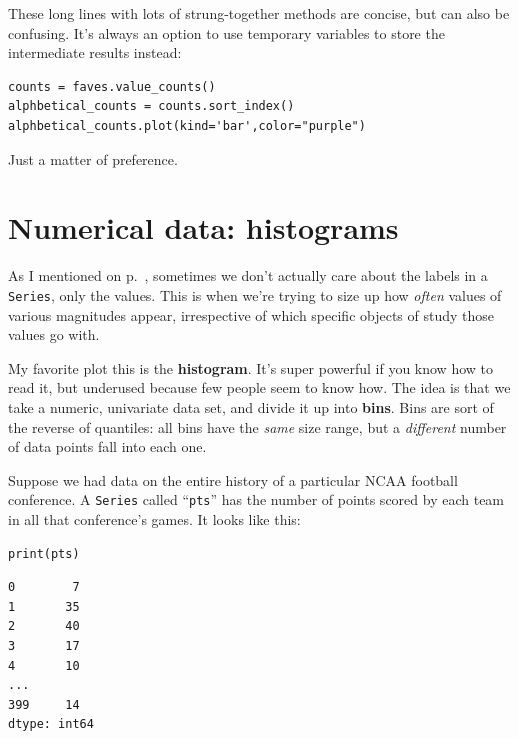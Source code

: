 These long lines with lots of strung-together methods are concise, but can also
be confusing. It's always an option to use temporary variables to store the
intermediate results instead:

\begin{Verbatim}[fontsize=\small,samepage=true,frame=single,framesep=3mm]
counts = faves.value_counts()
alphbetical_counts = counts.sort_index()
alphbetical_counts.plot(kind='bar',color="purple")
\end{Verbatim}

Just a matter of preference.

\section{Numerical data: histograms}


As I mentioned on p.~\pageref{twoWaysToPlotUnivariateData}, sometimes we don't
actually care about the labels in a \texttt{Series}, only the values. This is
when we're trying to size up how \textit{often} values of various magnitudes
appear, irrespective of which specific objects of study those values go with.


My favorite plot this is the \textbf{histogram}. It's super powerful if you
know how to read it, but underused because few people seem to know how. The
idea is that we take a numeric, univariate data set, and divide it up into
\textbf{bins}. Bins are sort of the reverse of quantiles: all bins have the
\textit{same} size range, but a \textit{different} number of data points fall
into each one.

\label{NCAAData}

Suppose we had data on the entire history of a particular NCAA football
conference. A \texttt{Series} called ``\texttt{pts}'' has the number of points
scored by each team in all that conference's games. It looks like this:

\begin{Verbatim}[fontsize=\small,samepage=true,frame=single,framesep=3mm]
print(pts)
\end{Verbatim}
\vspace{-.2in}

\begin{Verbatim}[fontsize=\small,samepage=true,frame=leftline,framesep=5mm,framerule=1mm]
0        7
1       35
2       40
3       17
4       10
...
399     14
dtype: int64
\end{Verbatim}

